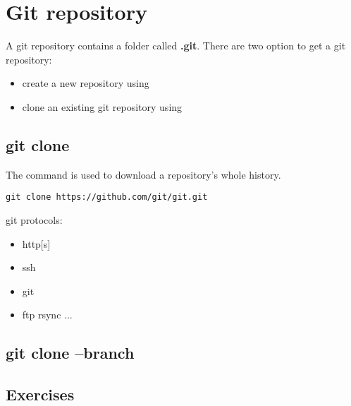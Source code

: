 \section{Git repository}
\begin{frame}[fragile]
    \slidetitle
    A git repository contains a folder called {\bf .git}. There are two option to get a git repository:
\begin{itemize}
\item create a new repository using 
\item clone an existing git repository using 
\end{itemize}
\end{frame}

\subsection{git clone}
\begin{frame}[fragile]
  \subslidetitle
  The command  is used to download a repository's whole history.
  \begin{lstlisting}
git clone https://github.com/git/git.git
  \end{lstlisting}

git protocols:
\begin{itemize}
\item http[s]
\item ssh
\item git
\item ftp rsync ...
\end{itemize}
\end{frame}

\subsection{git clone --branch}
\begin{frame}[fragile]
  \subslidetitle
\end{frame}

\subsection{Exercises}
\begin{frame}[fragile]
  \subslidetitle
\end{frame}
